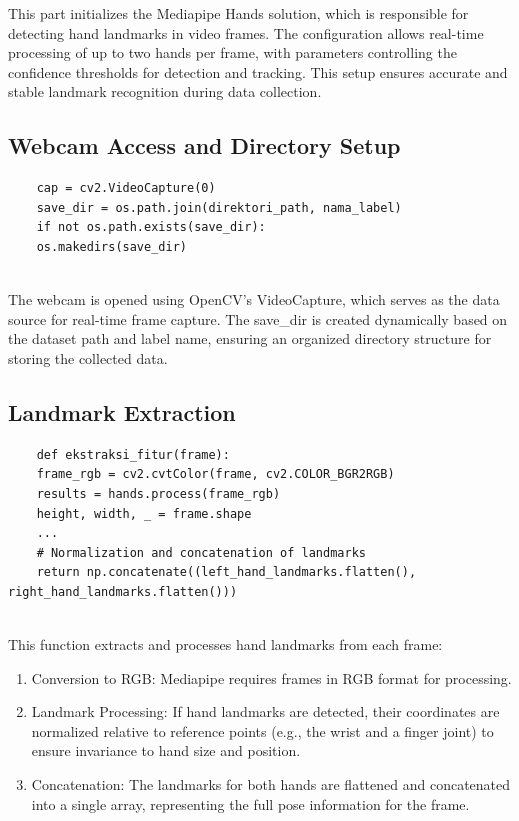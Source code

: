 This part initializes the Mediapipe Hands solution, which is responsible for detecting hand landmarks in video frames. The configuration allows real-time processing of up to two hands per frame, with parameters controlling the confidence thresholds for detection and tracking. This setup ensures accurate and stable landmark recognition during data collection.

\subsection{ Webcam Access and Directory Setup}

\begin{lstlisting}
	cap = cv2.VideoCapture(0)
	save_dir = os.path.join(direktori_path, nama_label)
	if not os.path.exists(save_dir):
	os.makedirs(save_dir)
	
\end{lstlisting}

The webcam is opened using OpenCV’s VideoCapture, which serves as the data source for real-time frame capture. The save\_dir is created dynamically based on the dataset path and label name, ensuring an organized directory structure for storing the collected data.

\subsection{Landmark Extraction}
\begin{lstlisting}
	def ekstraksi_fitur(frame):
	frame_rgb = cv2.cvtColor(frame, cv2.COLOR_BGR2RGB)
	results = hands.process(frame_rgb)
	height, width, _ = frame.shape
	...
	# Normalization and concatenation of landmarks
	return np.concatenate((left_hand_landmarks.flatten(), right_hand_landmarks.flatten()))
	
\end{lstlisting}

This function extracts and processes hand landmarks from each frame:
\begin{enumerate}
	\item Conversion to RGB: Mediapipe requires frames in RGB format for processing.
	\item Landmark Processing: If hand landmarks are detected, their coordinates are normalized relative to reference points (e.g., the wrist and a finger joint) to ensure invariance to hand size and position.
	\item Concatenation: The landmarks for both hands are flattened and concatenated into a single array, representing the full pose information for the frame.
\end{enumerate}


